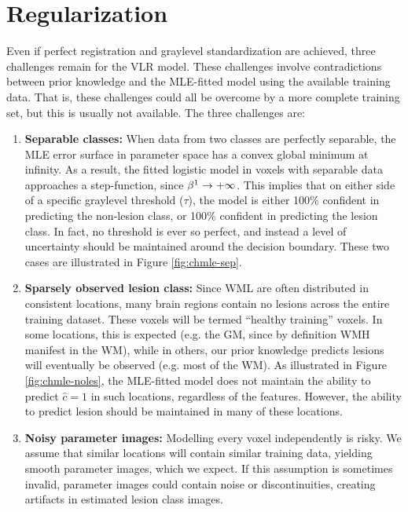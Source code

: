 \section{Regularization}
Even if perfect registration and graylevel standardization are achieved, three challenges remain for the VLR model. These challenges involve contradictions between prior knowledge and the MLE-fitted model using the available training data. That is, these challenges could all be overcome by a more complete training set, but this is usually not available. The three challenges are:
\begin{enumerate}
  \item \label{chmle:separable} \textbf{Separable classes:} 
  When data from two classes are perfectly separable, the MLE error surface in parameter space has a convex global minimum at infinity. As a result, the fitted logistic model in voxels with separable data approaches a step-function, since $\beta^1\rightarrow+\infty$. This implies that on either side of a specific graylevel threshold ($\tau$), the model is either 100\% confident in predicting the non-lesion class, or 100\% confident in predicting the lesion class. In fact, no threshold is ever so perfect, and instead a level of uncertainty should be maintained around the decision boundary. These two cases are illustrated in Figure \ref{fig:chmle-sep}.
  \item \label{chmle:sparse} \textbf{Sparsely observed lesion class:} 
  Since WML are often distributed in consistent locations, many brain regions contain no lesions across the entire training dataset. These voxels will be termed ``healthy training'' voxels. In some locations, this is expected (e.g. the GM, since by definition WMH manifest in the WM), while in others, our prior knowledge predicts lesions will eventually be observed (e.g. most of the WM). As illustrated in Figure \ref{fig:chmle-noles}, the MLE-fitted model does not maintain the ability to predict $\hat{c} = 1$ in such locations, regardless of the features. However, the ability to predict lesion should be maintained in many of these locations.
  \item \label{chmle:noisy} \textbf{Noisy parameter images:} 
  Modelling every voxel independently is risky. We assume that similar locations will contain similar training data, yielding smooth parameter images, which we expect. If this assumption is sometimes invalid, parameter images could contain noise or discontinuities, creating artifacts in estimated lesion class images.
\end{enumerate}

